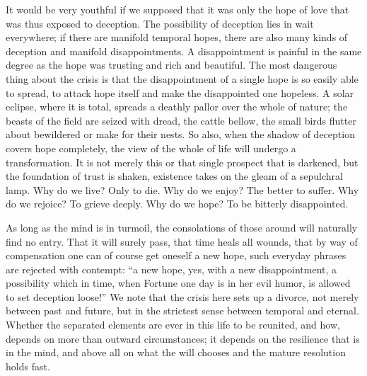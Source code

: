 \documentclass[12pt,a4paper,openany]{book}
\newcommand{\opage}[1]{\marginnote{\footnotesize\textit{[#1]}}}
\begin{document}
It would be very youthful if we supposed
that it was only the hope of love that was thus exposed
to deception. The possibility of deception lies in wait everywhere;
if there are manifold temporal hopes, there are also
many kinds of deception and manifold disappointments. A
disappointment is painful in the same degree as the hope was
trusting and rich and beautiful. The most dangerous thing about the crisis
is that the disappointment of a single hope is so easily able
to spread, to attack hope itself and make the
disappointed one hopeless. A solar eclipse, where it is
total, spreads a deathly pallor over the whole of nature;
the beasts of the field are seized with dread, the cattle bellow, the small birds
flutter about bewildered or make for their nests.
So also, when the shadow of deception covers hope
completely, the view of the whole of life will undergo a
transformation. It is not merely this or that single
prospect that is darkened, but the foundation of trust is shaken,
existence takes on the gleam of a sepulchral lamp. Why
do we live? Only to die. Why do we enjoy? The better
to suffer. Why do we rejoice? To grieve deeply. Why
do we hope? To be bitterly disappointed.

As long as the mind is in turmoil, the consolations
of those around will naturally find no entry. That it
will surely pass, that time heals all wounds, that by way of
compensation one can of course get oneself a new hope, such everyday phrases
are rejected with contempt: ``a new hope, yes, with
a new disappointment, a possibility which in time, when
Fortune one day is in her evil humor, is allowed to
set deception loose!'' We note that the crisis here sets up
a divorce, not merely between past and future, but in
\setcounter{footnote}{0}%
\opage{25}the strictest sense between temporal and eternal. Whether the
separated elements are ever in this life to be reunited,
and how, depends on more than outward
circumstances; it depends on the resilience that
is in the mind, and above all on what the will chooses
and the mature resolution holds fast.
\end{document}
